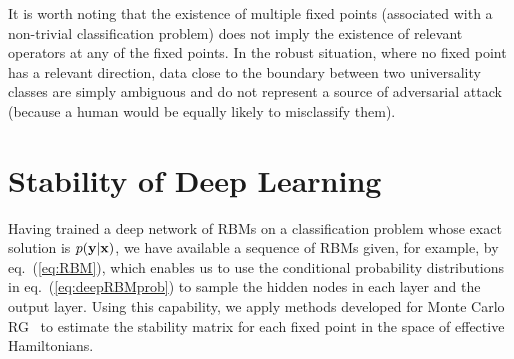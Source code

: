 \documentclass[reprint,amsmath,amssymb,aps]{revtex4-1}
\begin{document}
It is worth noting that the existence of multiple fixed points (associated with a non-trivial classification problem) does not imply the existence of relevant operators at any of the fixed points. In the robust situation, where no fixed point has a relevant direction, data close to the boundary between two universality classes are simply ambiguous and do not represent a source of adversarial attack (because a human would be equally likely to misclassify them). 

\section{\label{sec:exponents} Stability of Deep Learning}

Having trained a deep network of RBMs on a classification problem whose exact solution is $p({\bf y}|{\bf x})$, we have available a sequence of RBMs given, for example, by eq.~(\ref{eq:RBM}), which enables us to use the conditional probability distributions in eq.~(\ref{eq:deepRBMprob}) to sample the hidden nodes in each layer and the output layer. Using this capability, we apply methods developed for Monte Carlo RG~\cite{Ma1976, Swendsen1979} to estimate the stability matrix for each fixed point in the space of effective Hamiltonians.
\end{document}
